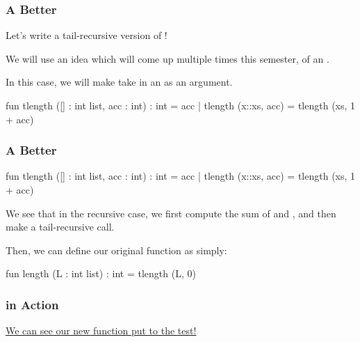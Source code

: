 \documentclass[aspectratio=169]{beamer}
\begin{document}
\begin{frame}[fragile]
  \frametitle{A Better }

  Let's write a tail-recursive version of !

  \pause
  \vspace{\fill}

  We will use an idea which will come up multiple times this semester, of an .

  \pause
  \vspace{\fill}


  \pause
  \vspace{\fill}

  In this case, we will make  take in an  as an argument.

  \pause
  \vspace{\fill}

  \begin{codeblock}
    fun tlength ([] : int list, acc : int) : int = acc
      | tlength (x::xs, acc) = tlength (xs, 1 + acc)
  \end{codeblock}
\end{frame}

\begin{frame}[fragile]
  \frametitle{A Better }

  \begin{codeblock}
    fun tlength ([] : int list, acc : int) : int = acc
      | tlength (x::xs, acc) = tlength (xs, 1 + acc)
  \end{codeblock}

  \pause
  \vspace{\fill}

  We see that in the recursive case, we first compute the sum of  and ,
  and then make a tail-recursive call.

  \pause
  \vspace{\fill}

  Then, we can define our original  function as simply:
  \begin{codeblock}
    fun length (L : int list) : int = tlength (L, 0)
  \end{codeblock}
\end{frame}

\begin{frame}[fragile]
  \frametitle{ in Action}

  \color{blue} \href{https://asciinema.org/a/587210}{We can see our new  function put to the test!}

\end{frame}
\end{document}
